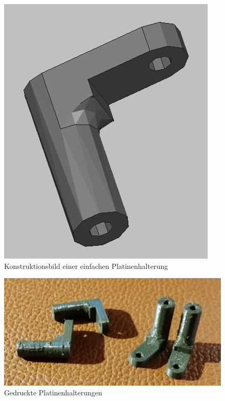 \begin{minipage}[b]{0.4\textwidth}
\centering
\begin{figure}[H] %
\includegraphics[width=.5\textwidth]{sec2/images/3DAnbaukomponenten/Konstruktionsbilder/PlatinenHalterungenKonstruktion} 
\centering
\captionsetup{width=.9\textwidth}
\caption[Konstruktionsbild einer einfachen Platinenhalterung]{Konstruktionsbild einer einfachen Platinenhalterung}
\centering
\label{fig:PlatinenHalterungenKonstruktion}
\end{figure}
\end{minipage}
\begin{minipage}[b]{0.54\textwidth}
\begin{figure}[H] %
\includegraphics[width=.9\textwidth]{sec2/images/3DAnbaukomponenten/Druckbilder/PlatinenHalterungenDruck} 
\centering
\captionsetup{width=.95\textwidth}
\caption[Gedruckte Platinenhalterungen]{Gedruckte Platinenhalterungen}
\centering
\label{fig:PlatinenHalterungenDruck}
\end{figure}
\end{minipage}
\vspace{8mm}

